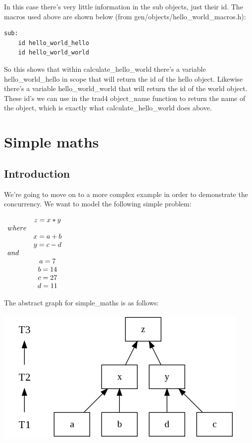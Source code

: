 \documentclass{report}
\begin{document}
In this case there's very little information in the sub objects, just their id. The macros used above are shown below (from gen/objects/hello_world_macros.h):

\begin{verbatim}
sub:
    id hello_world_hello
    id hello_world_world
\end{verbatim}

So this shows that within calculate_hello_world there's a variable hello_world_hello in scope that will return the id of the hello object. Likewise there's a variable hello_world_world that will return the id of the world object. These id's we can use in the trad4 object_name function to return the name of the object, which is exactly what calculate_hello_world does above.

\chapter{Simple maths}

\section{Introduction}

We're going to move on to a more complex example in order to demonstrate the concurrency. We want to model the following simple problem:

\begin{math}
  \begin{array}{ l c }
        & z = x * y   \\
        where         \\
        & x = a + b   \\
        & y = c - d   \\
        and           \\
        & a = 7       \\
        & b = 14      \\
        & c = 27      \\
        & d = 11      \\
  \end{array} 
\end{math}

The abstract graph for simple_maths is as follows:

\includegraphics[scale=0.5]{simplemathsabstract.png}
\end{document}
